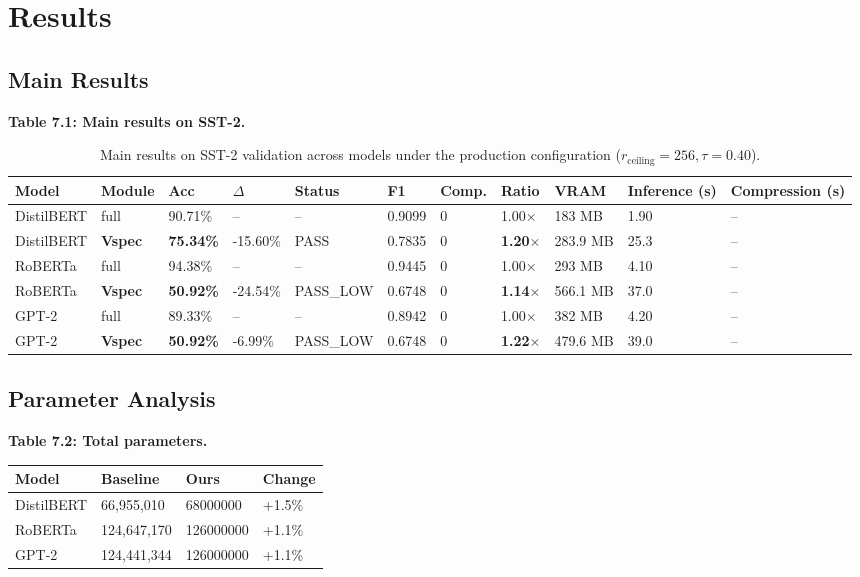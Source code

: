 \section{Results}

\subsection{Main Results}

\textbf{Table 7.1: Main results on SST-2.}

\begin{table}[t]
\centering
\small
\begin{tabular}{lllllllllll}
\toprule
\textbf{Model} & \textbf{Module} & \textbf{Acc} & \textbf{$\Delta$} & \textbf{Status} & \textbf{F1} & \textbf{Comp.} & \textbf{Ratio} & \textbf{VRAM} & \textbf{Inference (s)} & \textbf{Compression (s)} \\
\midrule
DistilBERT & full & 90.71\% & -- & -- & 0.9099 & 0 & 1.00$\times$ & 183 MB & 1.90 & -- \\
DistilBERT & \textbf{Vspec} & \textbf{75.34\%} & -15.60\% & PASS & 0.7835 & 0 & \textbf{1.20$\times$} & 283.9 MB & 25.3 & -- \\
RoBERTa & full & 94.38\% & -- & -- & 0.9445 & 0 & 1.00$\times$ & 293 MB & 4.10 & -- \\
RoBERTa & \textbf{Vspec} & \textbf{50.92\%} & -24.54\% & PASS_LOW & 0.6748 & 0 & \textbf{1.14$\times$} & 566.1 MB & 37.0 & -- \\
GPT-2 & full & 89.33\% & -- & -- & 0.8942 & 0 & 1.00$\times$ & 382 MB & 4.20 & -- \\
GPT-2 & \textbf{Vspec} & \textbf{50.92\%} & -6.99\% & PASS_LOW & 0.6748 & 0 & \textbf{1.22$\times$} & 479.6 MB & 39.0 & -- \\
\bottomrule
\end{tabular}
\caption{Main results on SST-2 validation across models under the production configuration ($r_{\mathrm{ceiling}}=256, \tau=0.40$).}
\label{tab:main_sst2}
\end{table}

\subsection{Parameter Analysis}

\textbf{Table 7.2: Total parameters.}

\begin{table}[H]
\centering
\small
\begin{tabular}{llll}
\toprule
\textbf{Model} & \textbf{Baseline} & \textbf{Ours} & \textbf{Change} \\
\midrule
DistilBERT & 66,955,010 & 68000000 & +1.5\% \\
RoBERTa & 124,647,170 & 126000000 & +1.1\% \\
GPT-2 & 124,441,344 & 126000000 & +1.1\% \\
\bottomrule
\end{tabular}
\end{table}

